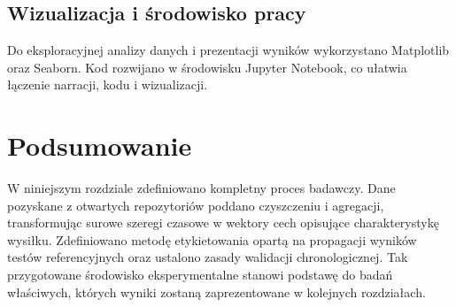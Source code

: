 \subsection{Wizualizacja i środowisko pracy}

Do eksploracyjnej analizy danych i prezentacji wyników wykorzystano Matplotlib oraz Seaborn.
Kod rozwijano w środowisku Jupyter Notebook, co ułatwia łączenie narracji, kodu i wizualizacji.

\section{Podsumowanie}

W niniejszym rozdziale zdefiniowano kompletny proces badawczy.
Dane pozyskane z otwartych repozytoriów poddano czyszczeniu i agregacji, transformując surowe szeregi czasowe w wektory cech opisujące charakterystykę wysiłku.
Zdefiniowano metodę etykietowania opartą na propagacji wyników testów referencyjnych oraz ustalono zasady walidacji chronologicznej.
Tak przygotowane środowisko eksperymentalne stanowi podstawę do badań właściwych, których wyniki zostaną zaprezentowane w kolejnych rozdziałach.